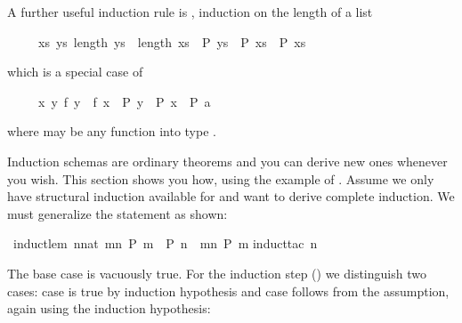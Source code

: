 \begin{isabellebody}
\begin{isamarkuptext}
A further useful induction rule is ,
induction on the length of a list
\begin{isabelle}%
\ \ \ \ \ {\isacharparenleft}{\isasymAnd}xs{\isachardot}\ {\isasymforall}ys{\isachardot}\ length\ ys\ {\isacharless}\ length\ xs\ {\isasymlongrightarrow}\ P\ ys\ {\isasymLongrightarrow}\ P\ xs{\isacharparenright}\ {\isasymLongrightarrow}\ P\ xs%
\end{isabelle}
which is a special case of 
\begin{isabelle}%
\ \ \ \ \ {\isacharparenleft}{\isasymAnd}x{\isachardot}\ {\isasymforall}y{\isachardot}\ f\ y\ {\isacharless}\ f\ x\ {\isasymlongrightarrow}\ P\ y\ {\isasymLongrightarrow}\ P\ x{\isacharparenright}\ {\isasymLongrightarrow}\ P\ a%
\end{isabelle}
where  may be any function into type .%
\end{isamarkuptext}%
\isamarkuptrue%
%
\isamarkuptrue%
%
\begin{isamarkuptext}%
\label{sec:derive-ind}
%
Induction schemas are ordinary theorems and you can derive new ones
whenever you wish.  This section shows you how, using the example
of . Assume we only have structural induction
available for  and want to derive complete induction.  We
must generalize the statement as shown:%
\end{isamarkuptext}%
\isamarkuptrue%
\isamarkupfalse%
\ induct{\isacharunderscore}lem{\isacharcolon}\ {\isachardoublequoteopen}{\isacharparenleft}{\isasymAnd}n{\isacharcolon}{\isacharcolon}nat{\isachardot}\ {\isasymforall}m{\isacharless}n{\isachardot}\ P\ m\ {\isasymLongrightarrow}\ P\ n{\isacharparenright}\ {\isasymLongrightarrow}\ {\isasymforall}m{\isacharless}n{\isachardot}\ P\ m{\isachardoublequoteclose}\isanewline
%
\isadelimproof
%
\endisadelimproof
%
\isatagproof
{}\isamarkupfalse%
{\isacharparenleft}induct{\isacharunderscore}tac\ n{\isacharparenright}%
\begin{isamarkuptxt}%
\noindent
The base case is vacuously true. For the induction step () we distinguish two cases: case  is true by induction
hypothesis and case  follows from the assumption, again using
the induction hypothesis:%
\end{isamarkuptxt}%

\end{isabellebody}
